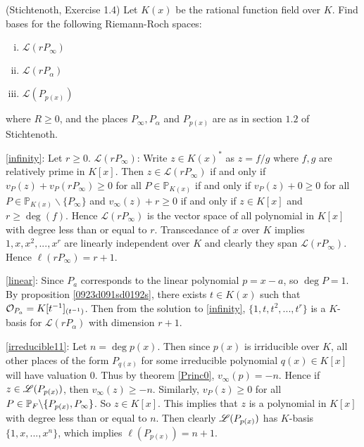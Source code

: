 \begin{exercise}(Stichtenoth, Exercise 1.4)
	Let $K(x)$ be the rational function field over $K$. Find 
	bases for the following Riemann-Roch spaces: 
	\begin{enumerate}[(i)]
		\item \label{infinity} 		$\mathscr{L}(rP_{\infty})$
		\item \label{linear}   		$\mathscr{L}(rP_{\alpha})$
		\item \label{irreducible11} 	$\mathscr{L}(P_{p(x)})$
	\end{enumerate}
	where $R \geq 0$, and the places $P_{\infty}, P_{\alpha}$ and $P_{p(x)}$
	are as in section $1.2$ of Stichtenoth. 
\end{exercise}

\begin{solution}
	\eqref{infinity}: Let $r \geq 0$. $\mathscr{L}(rP_{\infty})$: Write $z \in K(x)^*$ as $z = f/g$ 
	where $f,g$ are relatively prime in $K[x]$. Then $z \in \mathscr{L}(rP_\infty)$ 
	if and only if $v_P(z) + v_P(rP_\infty) \geq 0 $ for all 
	$P \in \mathbb{P}_{K(x)}$ if and only if $v_P(z) + 0 \geq 0 $ 
	for all $P\in \mathbb{P}_{K(x)} \backslash \lbrace P_\infty \rbrace $ 
	and $v_\infty(z) + r \geq 0$ if and only if $z \in K[x]$ and 
	$r \geq \deg(f)$. Hence $\mathscr{L}(r P_\infty)$ is the vector space 
	of all polynomial in $K[x]$ with degree less than or equal to 
	$r$. Transcedance of $x$ over $K$ implies $1,x,x^2,...,x^r$ 
	are linearly independent over $K$ and clearly they span 
	$\mathscr{L}(rP_\infty)$. Hence $\ell(rP_\infty) = r+1$. 

	\eqref{linear}: Since $P_a$ corresponds to the linear polynomial
	$p = x - a$, so $\deg P = 1$. By proposition \ref{0923d091sd0192s}, there 
	exists $t \in K(x)$ such that $\mathcal{O}_{P_a} = K[t^{-1}]_{(t^{-1})}$. Then
	from the solution to \eqref{infinity}, $\lbrace 1,t,t^2,...,t^r \rbrace$ is a $K$-basis
	for $\mathscr{L}(rP_{\alpha})$ with dimension $r + 1$.

	\eqref{irreducible11}: Let $n = \deg p(x)$. Then since 
	$p(x)$ is irriducible over $K$, all other places of 
	the form $P_{q(x)}$ for some irreducible polynomial $q(x) \in K[x]$
	will have valuation $0$. Thus by theorem \ref{Princ0}, $v_\infty(p) = -n$.
	Hence if $z \in \mathscr{L}(P_{p(x)})$, then $v_\infty(z) \geq -n$. 
	Similarly, $v_P(z) \geq 0$ for all $P \in \mathbb{P}_F \backslash \lbrace P_{p(x)},P_\infty \rbrace$.
	So $z \in K[x]$. This implies that $z$ is a polynomial in $K[x]$ with degree 
	less than or equal to $n$. Then clearly $\mathscr{L}(P_{p(x)})$ has $K$-basis $\lbrace 1,x,...,x^{n} \rbrace$,
	which implies $\ell(P_{p(x)}) = n+1$.
\end{solution}
  
